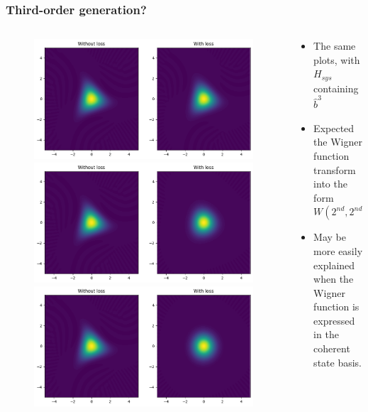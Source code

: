 \documentclass{beamer}
\begin{document}
\begin{frame}[c]
  \frametitle{Third-order generation?}
  \begin{columns}
    \begin{column}{0.5\linewidth}
    \begin{figure}
    \includegraphics[width=0.7\linewidth]{third_decay_0.2.png}
    \includegraphics[width=0.7\linewidth]{third_decay_0.5.png}
    \includegraphics[width=0.7\linewidth]{third_decay_1.0.png}
    \end{figure}
    \end{column}
    \begin{column}{0.5\linewidth}
      \begin{itemize}
        \item The same plots, with $H_{sys}$ containing $\hat{b}^{3}$
        \item Expected the Wigner function transform into the form $W(2^{nd},2^{nd})$
        \item May be more easily explained when the Wigner function is expressed in the coherent state basis.
      \end{itemize}
    \end{column}
  \end{columns}
\end{frame}
\end{document}
